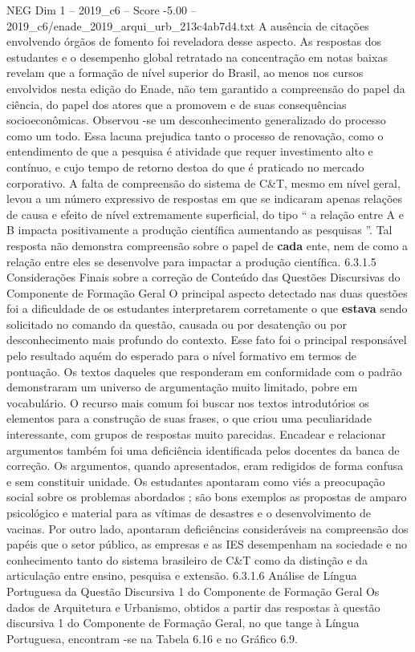\begin{textsample}{NEG Dim 1 – 2019\_c6 – Score -5.00 – 2019\_c6/enade\_2019\_arqui\_urb\_213c4ab7d4.txt}
A ausência de citações envolvendo órgãos de fomento foi reveladora desse aspecto.
As respostas dos estudantes e o desempenho global retratado na concentração em notas baixas revelam que a formação de nível superior do Brasil, ao menos nos cursos envolvidos nesta edição do Enade, não tem garantido a compreensão do papel da ciência, do papel dos atores que a promovem e de suas consequências socioeconômicas.
Observou -se um desconhecimento generalizado do processo como um todo.
Essa lacuna prejudica tanto o processo de renovação, como o entendimento de que a pesquisa é atividade que requer investimento alto e contínuo, e cujo tempo de retorno destoa do que é praticado no mercado corporativo.
A falta de compreensão do sistema de C\&T, mesmo em nível geral, levou a um número expressivo de respostas em que se indicaram apenas relações de causa e efeito de nível extremamente superficial, do tipo “ a relação entre A e B impacta positivamente a produção científica aumentando as pesquisas ”.
Tal resposta não demonstra compreensão sobre o papel de \textbf{cada} ente, nem de como a relação entre eles se desenvolve para impactar a produção científica. 6.3.1.5 Considerações Finais sobre a correção de Conteúdo das Questões Discursivas do Componente de Formação Geral O principal aspecto detectado nas duas questões foi a dificuldade de os estudantes interpretarem corretamente o que \textbf{estava} sendo solicitado no comando da questão, causada ou por desatenção ou por desconhecimento mais profundo do contexto.
Esse fato foi o principal responsável pelo resultado aquém do esperado para o nível formativo em termos de pontuação.
Os textos daqueles que responderam em conformidade com o padrão demonstraram um universo de argumentação muito limitado, pobre em vocabulário.
O recurso mais comum foi buscar nos textos introdutórios os elementos para a construção de suas frases, o que criou uma peculiaridade interessante, com grupos de respostas muito parecidas.
Encadear e relacionar argumentos também foi uma deficiência identificada pelos docentes da banca de correção.
Os argumentos, quando apresentados, eram redigidos de forma confusa e sem constituir unidade.
Os estudantes apontaram como viés a preocupação social sobre os problemas abordados ; são bons exemplos as propostas de amparo psicológico e material para as vítimas de desastres e o desenvolvimento de vacinas.
Por outro lado, apontaram deficiências consideráveis na compreensão dos papéis que o setor público, as empresas e as IES desempenham na sociedade e no conhecimento tanto do sistema brasileiro de C\&T como da distinção e da articulação entre ensino, pesquisa e extensão. 6.3.1.6 Análise de Língua Portuguesa da Questão Discursiva 1 do Componente de Formação Geral Os dados de Arquitetura e Urbanismo, obtidos a partir das respostas à questão discursiva 1 do Componente de Formação Geral, no que tange à Língua Portuguesa, encontram -se na Tabela 6.16 e no Gráfico 6.9.

\end{textsample}
